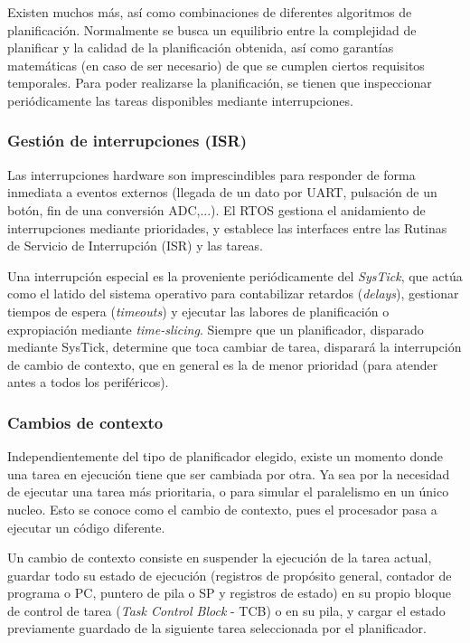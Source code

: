 \documentclass[../main.tex]{subfiles}
\begin{document}
            Existen muchos más, así como combinaciones de diferentes algoritmos de planificación. Normalmente se busca un equilibrio entre la complejidad de planificar y la calidad de la planificación obtenida, así como garantías matemáticas (en caso de ser necesario) de que se cumplen ciertos requisitos temporales. Para poder realizarse la planificación, se tienen que inspeccionar periódicamente las tareas disponibles mediante interrupciones.

        \subsubsection{Gestión de interrupciones (ISR)} 
            Las interrupciones hardware son imprescindibles para responder de forma inmediata a eventos externos (llegada de un dato por UART, pulsación de un botón, fin de una conversión ADC,...). El RTOS gestiona el anidamiento de interrupciones mediante prioridades, y establece las interfaces entre las Rutinas de Servicio de Interrupción (ISR) y las tareas. 
            
            Una interrupción especial es la proveniente periódicamente del \emph{SysTick}, que actúa como el latido del sistema operativo para contabilizar retardos (\emph{delays}), gestionar tiempos de espera (\emph{timeouts}) y ejecutar las labores de planificación o expropiación mediante \emph{time-slicing}. Siempre que un planificador, disparado mediante SysTick, determine que toca cambiar de tarea, disparará la interrupción de cambio de contexto, que en general es la de menor prioridad (para atender antes a todos los periféricos).

        \subsubsection{Cambios de contexto}
            Independientemente del tipo de planificador elegido, existe un momento donde una tarea en ejecución tiene que ser cambiada por otra. Ya sea por la necesidad de ejecutar una tarea más prioritaria, o para simular el paralelismo en un único nucleo. Esto se conoce como el cambio de contexto, pues el procesador pasa a ejecutar un código diferente.
            
            Un cambio de contexto consiste en suspender la ejecución de la tarea actual, guardar todo su estado de ejecución (registros de propósito general, contador de programa o PC, puntero de pila o SP y registros de estado) en su propio bloque de control de tarea (\emph{Task Control Block} - TCB) o en su pila, y cargar el estado previamente guardado de la siguiente tarea seleccionada por el planificador. 
\end{document}
